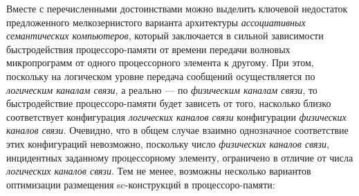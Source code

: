 Вместе с перечисленными достоинствами можно выделить ключевой недостаток предложенного мелкозернистого варианта архитектуры \textit{ассоциативных семантических компьютеров}, который заключается в сильной зависимости быстродействия процессоро-памяти от времени передачи волновых микропрограмм от одного процессорного элемента к другому. При этом, поскольку на логическом уровне передача сообщений осуществляется по \textit{логическим каналам связи}, а реально --- по \textit{физическим каналам связи}, то быстродействие процессоро-памяти будет зависеть от того, насколько близко соответствует конфигурация \textit{логических каналов связи} конфигурации \textit{физических каналов связи}. Очевидно, что в общем случае взаимно однозначное соответствие этих конфигураций невозможно, поскольку число \textit{физических каналов связи}, инцидентных заданному процессорному элементу, ограничено в отличие от числа \textit{логических каналов связи}. Тем не менее, возможны несколько вариантов оптимизации размещения sc-конструкций в процессоро-памяти:
